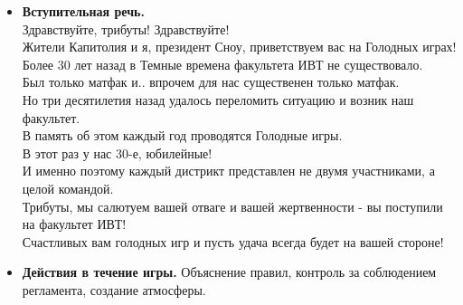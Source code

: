 
\begin{itemize}
\item \textbf{Вступительная речь.}\\
Здравствуйте, трибуты! Здравствуйте!\\
Жители Капитолия и я, президент Сноу, приветствуем вас на Голодных играх!\\
Более 30 лет назад в Темные времена факультета ИВТ не существовало.\\
Был только матфак и.. впрочем для нас существенен только матфак.\\
Но три десятилетия назад удалось переломить ситуацию и возник наш факультет.\\
В память об этом каждый год проводятся Голодные игры.\\
В этот раз у нас 30-е, юбилейные!\\
И именно поэтому каждый дистрикт представлен не двумя участниками, а целой командой.\\
Трибуты, мы салютуем вашей отваге и вашей жертвенности - вы поступили на факультет ИВТ!\\
Счастливых вам голодных игр и пусть удача всегда будет на вашей стороне!

\item \textbf{Действия в течение игры.} Объяснение правил, контроль за соблюдением регламента, создание атмосферы.
\end{itemize}